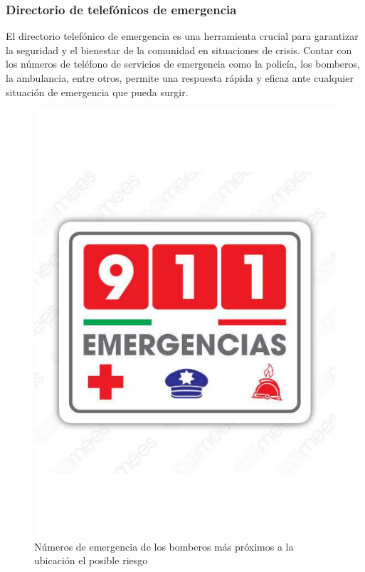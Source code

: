     \subsubsection{Directorio de telefónicos de emergencia}
    El directorio telefónico de emergencia es una herramienta crucial para garantizar la seguridad y el bienestar de la comunidad en situaciones de crisis. Contar con los números de teléfono de servicios de emergencia como la policía, los bomberos, la ambulancia, entre otros, permite una respuesta rápida y eficaz ante cualquier situación de emergencia que pueda surgir.
    
    \begin{figure}[H]
        \centering
        \includegraphics[scale=0.25]{9/Img/emergencias.pdf}
        \caption{Números de emergencia de los bomberos más próximos a la ubicación el posible riesgo}
    \end{figure}
